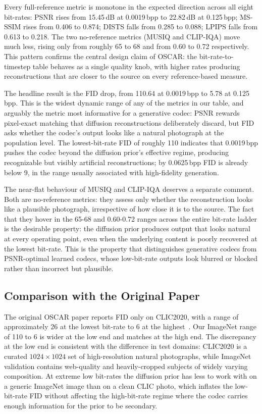 \documentclass[conference]{IEEEtran}
\begin{document}
Every full-reference metric is monotone in the expected direction across
all eight bit-rates: PSNR rises from 15.45\,dB at 0.0019\,bpp to 22.82\,dB
at 0.125\,bpp; MS-SSIM rises from 0.406 to 0.874; DISTS falls from 0.285
to 0.088; LPIPS falls from 0.613 to 0.218. The two no-reference metrics
(MUSIQ and CLIP-IQA) move much less, rising only from roughly 65 to 68
and from 0.60 to 0.72 respectively. This pattern confirms the central
design claim of OSCAR: the bit-rate-to-timestep table behaves as a
single quality knob, with higher rates producing reconstructions that
are closer to the source on every reference-based measure.

The headline result is the FID drop, from 110.64 at 0.0019\,bpp to 5.78
at 0.125\,bpp. This is the widest dynamic range of any of the metrics
in our table, and arguably the metric most informative for a generative
codec: PSNR rewards pixel-exact matching that diffusion reconstructions
deliberately discard, but FID asks whether the codec's output looks like
a natural photograph at the population level. The lowest-bit-rate FID of
roughly 110 indicates that 0.0019\,bpp pushes the codec beyond the
diffusion prior's effective regime, producing recognizable but visibly
artificial reconstructions; by 0.0625\,bpp FID is already below 9, in the
range usually associated with high-fidelity generation.

The near-flat behaviour of MUSIQ and CLIP-IQA deserves a separate
comment. Both are no-reference metrics: they assess only whether the
reconstruction looks like a plausible photograph, irrespective of how
close it is to the source. The fact that they hover in the 65-68 and
0.60-0.72 ranges across the entire bit-rate ladder is the desirable
property: the diffusion prior produces output that looks natural at every
operating point, even when the underlying content is poorly recovered at
the lowest bit-rate. This is the property that distinguishes generative
codecs from PSNR-optimal learned codecs, whose low-bit-rate outputs look
blurred or blocked rather than incorrect but plausible.

\subsection{Comparison with the Original Paper}

The original OSCAR paper reports FID only on CLIC2020, with a range of
approximately 26 at the lowest bit-rate to 6 at the highest~\cite{oscar}.
Our ImageNet range of 110 to 6 is wider at the low end and matches at the
high end. The discrepancy at the low end is consistent with the
difference in test domains: CLIC2020 is a curated $1024 \times 1024$ set
of high-resolution natural photographs, while ImageNet validation
contains web-quality and heavily-cropped subjects of widely varying
composition. At extreme low bit-rates the diffusion prior has less to
work with on a generic ImageNet image than on a clean CLIC photo, which
inflates the low-bit-rate FID without affecting the high-bit-rate regime
where the codec carries enough information for the prior to be
secondary.
\end{document}

